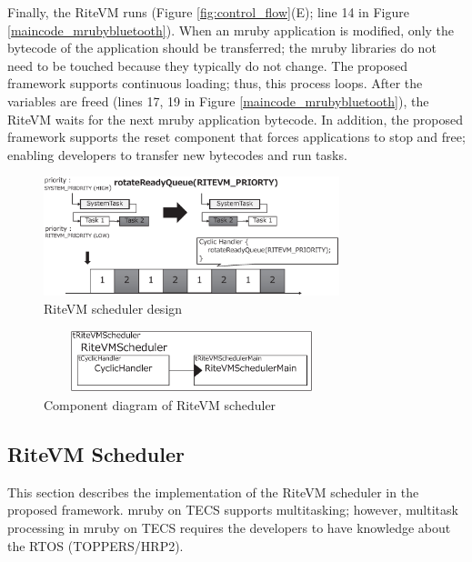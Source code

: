 \documentclass[conference]{IEEEtran/IEEEtran/IEEEtran}
\begin{document}
Finally, the RiteVM runs (Figure \ref{fig:control_flow}(E); line 14 in Figure \ref{maincode_mrubybluetooth}).
When an mruby application is modified, only the bytecode of the application should be transferred; the mruby libraries do not need to be touched because they typically do not change.
The proposed framework supports continuous loading; thus, this process loops.
After the variables are freed (lines 17, 19 in Figure \ref{maincode_mrubybluetooth}), the RiteVM waits for the next mruby application bytecode.
In addition, the proposed framework supports the reset component that forces applications to stop and free; enabling developers to transfer new bytecodes and run tasks.

\begin{figure}[t]
    \centering
    \includegraphics[width=8.6cm,clip]{figure/rotateReadyQueue.eps}
    \vspace{-3mm}
\caption{RiteVM scheduler design}
    \vspace{-3mm}
\label{fig:rotateReadyQueue}
\end{figure} 

\begin{figure}[t]
    \centering
    \includegraphics[height=1.8cm,width=8.6cm,clip]{figure/cyclic_handler.eps}
    \vspace{-3mm}
\caption{Component diagram of RiteVM scheduler}
    \vspace{-3mm}
\label{fig:cyclic_handler}
\end{figure}

\subsection{RiteVM Scheduler}
\label{sec:RiteVM Scheduler}
This section describes the implementation of the RiteVM scheduler in the proposed framework.
mruby on TECS supports multitasking; however, multitask processing in mruby on TECS requires the developers to have knowledge about the RTOS (TOPPERS/HRP2).
\end{document}
